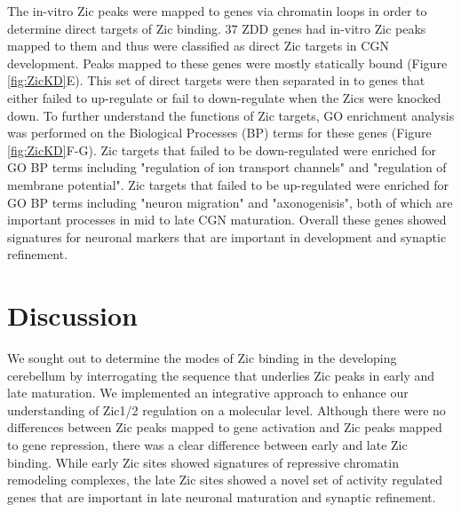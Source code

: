 \documentclass[fleqn,10pt]{wlscirep}
\begin{document}
The in-vitro Zic peaks were mapped to genes via chromatin loops in order to determine direct targets of Zic binding. 37 ZDD genes had in-vitro Zic peaks mapped to them and thus were classified as direct Zic targets in CGN development. Peaks mapped to these genes were mostly statically bound (Figure \ref{fig:ZicKD}E). This set of direct targets were then separated in to genes that either failed to up-regulate or fail to down-regulate when the Zics were knocked down. To further understand the functions of Zic targets, GO enrichment analysis was performed on the Biological Processes (BP) terms for these genes (Figure \ref{fig:ZicKD}F-G). Zic targets that failed to be down-regulated were enriched for GO BP terms including "regulation of ion transport channels" and "regulation of membrane potential". Zic targets that failed to be up-regulated were enriched for GO BP  terms including "neuron migration" and "axonogenisis", both of which are important processes in mid to late CGN maturation. Overall these genes showed signatures for neuronal markers that are important in development and synaptic refinement. 

\section*{Discussion}
We sought out to determine the modes of Zic binding in the developing cerebellum by interrogating the sequence that underlies Zic peaks in early and late maturation. We implemented an integrative approach to enhance our understanding of Zic1/2 regulation on a molecular level. Although there were no differences between Zic peaks mapped to gene activation and Zic peaks mapped to gene repression, there was a clear difference between early and late Zic binding. While early Zic sites showed signatures of repressive chromatin remodeling complexes, the late Zic sites showed a novel set of activity regulated genes that are important in late neuronal maturation and synaptic refinement. 


\end{document}
